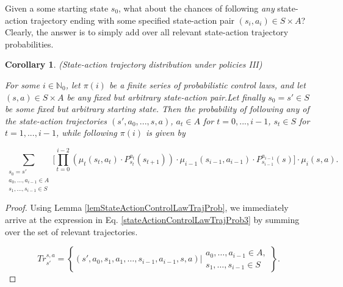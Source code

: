 \documentclass[11pt]{article} %
\newtheorem{cor}{Corollary}
\begin{document}
Given a some starting state $s_0$, what about the chances of following \textit{any} state-action trajectory ending with some specified state-action pair $(s_i,a_i) \in S \times A$? Clearly, the answer is to simply add over all relevant state-action trajectory probabilities.

\begin{cor}(State-action trajectory distribution under policies III)\label{corStateActionControlLawTrajProb2}

For some $i \in \mathbb{N}_0$, let $\pi(i)$ be a finite series of probabilistic control laws, and let $(s,a) \in S \times A$ be any fixed but arbitrary state-action pair.Let finally $s_0 = s' \in S$ be some fixed but arbitrary starting state. Then the probability of following \textit{any} of the state-action trajectories $(s',a_0,...,s,a)$, $a_t \in A$ for $t=0,...,i-1$, $s_t \in S$ for $t=1,...,i-1$, while following $\pi(i)$ is given by

\begin{equation}\label{stateActionControlLawTrajProb3}
	\sum_{\begin{array}{c}
			s_0 = s' \\
			a_0,\dots,a_{i-1} \in A \\
			s_1,\dots,s_{i-1} \in S
		\end{array}}\Big[ \prod_{t=0}^{i-2} \left( \mu_t(s_t,a_t) \cdot P^{a_t}_{s_t}(s_{t+1}) \right) \cdot \mu_{i-1}(s_{i-1},a_{i-1}) \cdot P^{a_{i-1}}_{s_{i-1}}(s) \Big] \cdot \mu_i(s,a).
\end{equation}

\end{cor}

\begin{proof}

Using Lemma \ref{lemStateActionControlLawTrajProb}, we immediately arrive at the expression in Eq. \ref{stateActionControlLawTrajProb3} by summing over the set of relevant trajectories.

\begin{equation}\label{}
	Tr_{s'}^{s,a} =  \left\{(s',a_0,s_1,a_1,\dots,s_{i-1},a_{i-1},s,a) \Bigg| \begin{array}{lr}
															a_0, \dots, a_{i-1} \in A, \\
															s_1,\dots,s_{i-1} \in S
													\end{array} \right\}.
\end{equation}

\end{proof}
\end{document}
